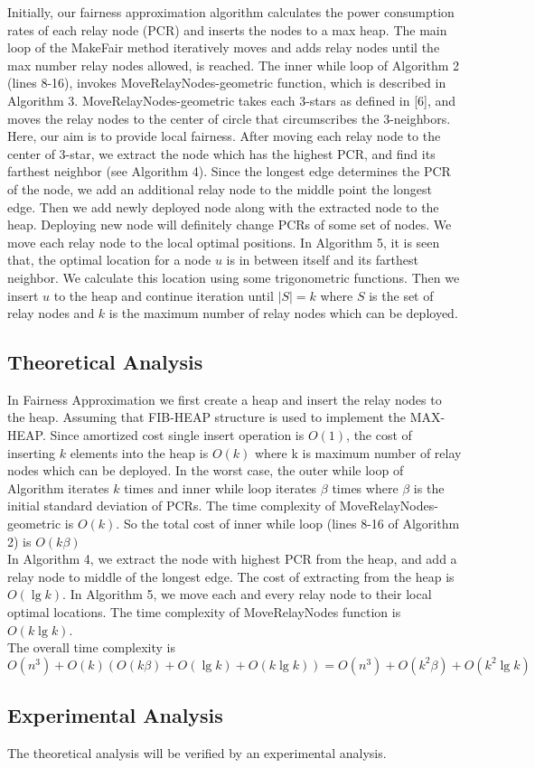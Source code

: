 Initially, our fairness approximation algorithm calculates the power consumption rates of each relay node (PCR) and inserts the nodes to a max heap. The main loop of the MakeFair method iteratively moves and adds relay nodes until the max number relay nodes allowed, is reached. The inner while loop of Algorithm 2 (lines 8-16), invokes MoveRelayNodes-geometric function, which is described in Algorithm 3. MoveRelayNodes-geometric takes each 3-stars as defined in [6], and moves the relay nodes to the center of circle that circumscribes the 3-neighbors. Here, our aim is to provide local fairness. After moving each relay node to the center of 3-star, we extract the node which has the highest PCR, and find its farthest neighbor (see Algorithm 4). Since the longest edge determines the PCR of the node, we add an additional relay node to the middle point the longest edge. Then we add newly deployed node along with the extracted node to the heap. Deploying new node will definitely change PCRs of some set of nodes. We move each relay node to the local optimal positions. In Algorithm 5, it is seen that, the optimal location for a node $u$ is in between itself and its farthest neighbor. We calculate this location using some trigonometric functions. Then we insert $u$ to the heap and continue iteration until $\left|S\right|=k$ where $S$ is the set of relay nodes and $k$ is the maximum number of relay nodes which can be deployed.


\subsection{Theoretical Analysis}

In Fairness Approximation we first create a heap and insert the relay nodes to the heap. Assuming that FIB-HEAP structure is used to implement the MAX-HEAP. Since amortized cost single insert operation is $O(1)$, the cost of inserting $k$ elements into the heap is $O(k)$ where k is maximum number of relay nodes which can be deployed. In the worst case, the outer while loop of Algorithm iterates $k$ times and inner while loop iterates $\beta$ times where $\beta$ is the initial standard deviation of PCRs. The time complexity of MoveRelayNodes-geometric is $O(k)$. So the total cost of inner while loop (lines 8-16 of Algorithm 2) is $O(k\beta)$ \\

In Algorithm 4, we extract the node with highest PCR from the heap, and add a relay node to middle of the longest edge. The cost of extracting from the heap is $O(\lg k)$. In Algorithm 5, we move each and every relay node to their local optimal locations. The time complexity of MoveRelayNodes function is $O(k \lg k)$.\\

The overall time complexity is $O(n^{3})+O(k)(O(k\beta)+O(\lg k)+O(k \lg k))=O(n^3)+O(k^{2}\beta)+O(k^{2} \lg k)$

\subsection{Experimental Analysis}
The theoretical analysis will be verified by an experimental analysis.


